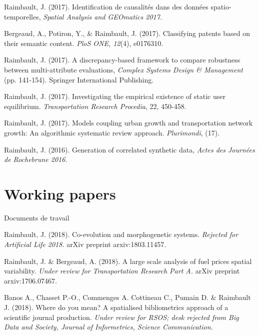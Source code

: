 \bigskip

\noindent Raimbault, J. (2017). Identification de causalités dans des données spatio-temporelles, \textit{Spatial Analysis and GEOmatics 2017.}



\bigskip

\noindent Bergeaud, A., Potiron, Y., \& Raimbault, J. (2017). Classifying patents based on their semantic content. \textit{PloS ONE, 12}(4), e0176310.

\bigskip

\noindent Raimbault, J. (2017). A discrepancy-based framework to compare robustness between multi-attribute evaluations, \textit{Complex Systems Design \& Management} (pp. 141-154). Springer International Publishing. 

\bigskip

\noindent Raimbault, J. (2017). Investigating the empirical existence of static user equilibrium. \textit{Transportation Research Procedia}, 22, 450-458. 


\bigskip

\noindent Raimbault, J. (2017). Models coupling urban growth and transportation network growth: An algorithmic systematic review approach. \textit{Plurimondi}, (17).


\bigskip


\noindent Raimbault, J. (2016). Generation of correlated synthetic data, \textit{Actes des Journ{\'e}es de Rochebrune 2016.}






\section*{Working papers}{Documents de travail}


\noindent Raimbault, J. (2018). Co-evolution and morphogenetic systems. \textit{Rejected for Artificial Life 2018.} arXiv preprint arxiv:1803.11457.


\bigskip

\noindent Raimbault, J. \& Bergeaud, A. (2018). A large scale analysis of fuel prices spatial variability. \textit{Under review for Transportation Research Part A.} arXiv preprint arxiv:1706.07467.


\bigskip

\noindent Banos A., Chasset P.-O., Commenges A. Cottineau C., Pumain D. \& Raimbault J. (2018). Where do you mean? A spatialised bibliometrics approach of a scientific journal production. \textit{Under review for RSOS; desk rejected from Big Data and Society, Journal of Informetrics, Science Communication.}


